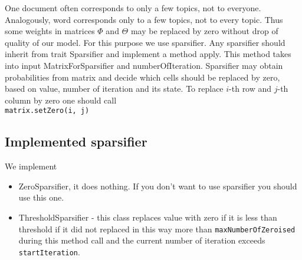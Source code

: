 One document often corresponds to only a few topics, not to everyone. Analogously,
word corresponds only to a few topics, not to every topic. Thus some weights in
matrices $\Phi$ and $\Theta$ may be replaced by zero without drop of quality of our model. For this purpose we use
sparsifier. Any sparsifier should inherit from trait Sparsifier and implement a method apply. This method takes into input
MatrixForSparsifier and numberOfIteration. Sparsifier may obtain probabilities from matrix and decide which cells should be replaced
by zero, based on value, number of iteration and its state. To replace $i$\--th row and $j$\--th column by zero one should call\\
\texttt{matrix.setZero(i, j)}\\

\subsection{Implemented sparsifier}
    We implement
    \begin{itemize}
	\item ZeroSparsifier, it does nothing. If you don't want to use sparsifier you should use this one. 
	\item ThresholdSparsifier \-- this class replaces value with zero if it is less than threshold if it did not replaced in this way more than \texttt{maxNumberOfZeroised} during this method call and the current number of iteration exceeds \texttt{startIteration}.
    \end{itemize}

